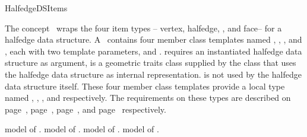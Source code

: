 
\ccRefPageBegin



\begin{ccRefConcept}{HalfedgeDSItems}

\ccDefinition
  
The concept \ccRefName\ wraps the four item types -- vertex,
halfedge, { }, and face-- for a halfedge data structure.
A \ccRefName\ contains four member class templates named ,
, { },
and , each with two template parameters,  and .
 requires an
instantiated halfedge data structure  as argument,
 is a geometric traits class supplied by the class that
uses the halfedge data structure as internal representation. 
is not used by the halfedge data structure itself. These four member 
class templates provide a local type named , ,
{ }, and  respectively.
The requirements on these
types are described on page~\pageref{pageHalfedgeDSItemsVertexRef},
page~\pageref{pageHalfedgeDSItemsHalfedgeRef}, 
page~\pageref{pageHalfedgeDSItemsHalfedgeCycleRef}, 
and page~\pageref{pageHalfedgeDSItemsFaceRef} respectively.

\ccTypes
{}

    {model of .}
\ccGlue
{}
    {model of .}
\ccGlue
{}
    {model of .}
\ccGlue
{}
    { model of .}

\ccHasModels

\\
\\


\end{ccRefConcept}
